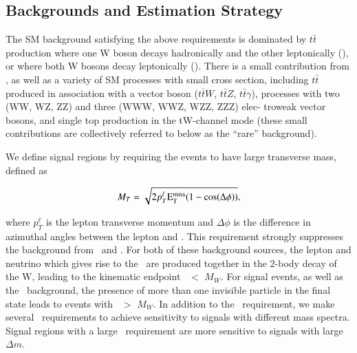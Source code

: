 \subsection{Backgrounds and Estimation Strategy}

The SM background satisfying the above requirements is dominated by $t\bar{t}$ production where
one W boson decays hadronically and the other leptonically (\ttljets), or where both W bosons decay leptonically (\ttll).
There is a small contribution from \wjets, as well as a variety of SM
processes with small cross section, including $t\bar{t}$ produced in association with a vector boson
($t\bar{t}W$, $t\bar{t}Z$, $t\bar{t}\gamma$), processes with two (WW, WZ, ZZ) and three (WWW, WWZ, WZZ, ZZZ) elec-
troweak vector bosons, and single top production in the tW-channel mode (these small contributions are collectively
referred to below as the ``rare'' background).

We define signal regions by requiring the events to have large transverse mass, defined as

\begin{equation}
M_T = \sqrt{ 2 p_{T}^{\ell} \rm{E_{T}^{miss}} ( 1-cos(\Delta\phi))},
\end{equation}

where $p_{T}^{\ell}$ is the lepton transverse momentum and $\Delta\phi$ is the difference in azimuthal angles between the lepton
and \met. This requirement strongly suppresses the background from \ttljets\ and \wjets. For both of these background sources, the lepton
and neutrino which gives rise to the \met\ are produced together in the 2-body decay of the W, leading to the kinematic
endpoint \mt\ $<$ $M_W$. For signal events, as well as the \ttll\ background, the presence of more than one invisible
particle in the final state leads to events with \mt\ $>$ $M_W$. In addition to the \mt\ requirement, we make several 
\met\ requirements to achieve sensitivity to signals with different mass spectra.
Signal regions with a large \met\ requirement are more sensitive to signals with large $\Delta m$.

